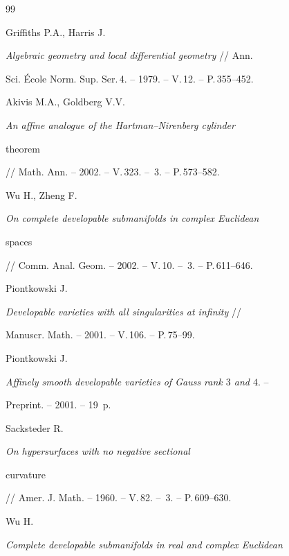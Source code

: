 \begin{thebibliography}{99}


Griffiths P.A., Harris J.


{\em Algebraic geometry and local differential geometry} // Ann.


Sci. \'{E}cole Norm. Sup. Ser.\,4. -- 1979. -- V.\,12. -- P.\,355--452.







Akivis M.A., Goldberg V.V.


{\em An affine analogue of the Hartman--Nirenberg cylinder


theorem} // Math. Ann. -- 2002. -- V.\,323. -- \No\,3. -- P.\,573--582.







Wu H., Zheng F.


{\em On complete developable submanifolds in complex Euclidean


spaces} // Comm. Anal. Geom. -- 2002. -- V.\,10. -- \No\,3. -- P.\,611--646.







Piontkowski J.


{\em Developable varieties with all singularities at infinity} //


Manuscr. Math. -- 2001. -- V.\,106. -- P.\,75--99.







Piontkowski J.


{\em Affinely smooth developable varieties of Gauss rank $3$ and $4$}. --


Preprint. -- 2001. -- 19~p.







Sacksteder R.


{\em On hypersurfaces with no negative sectional


curvature} // Amer. J. Math. -- 1960. -- V.\,82. -- \No\,3. -- P.\,609--630.







Wu H. {\em Complete developable submanifolds in real and complex Euclidean


}
\end{thebibliography}
